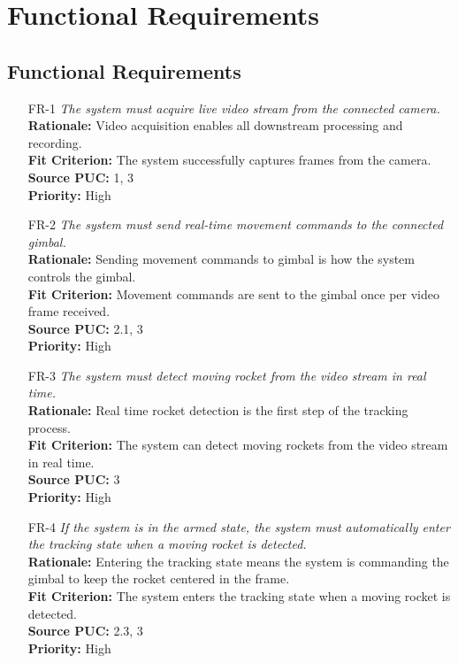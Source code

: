 \documentclass[12pt]{article}
\begin{document}
\section{Functional Requirements}
\subsection{Functional Requirements}

\begin{itemize}[leftmargin=*]

  \item[FR-1] \emph{The system must acquire live video stream from the connected
          camera.}\\[2mm]
        \textbf{Rationale:} Video acquisition enables all downstream processing and recording.\\
        \textbf{Fit Criterion:} The system successfully captures frames from the camera.\\
        \textbf{Source PUC:} 1, 3 \\
        \textbf{Priority:} High

  \item[FR-2] \emph{The system must send real-time movement commands to the connected
          gimbal.}\\[2mm]
        \textbf{Rationale:} Sending movement commands to gimbal is how the system controls the gimbal.\\
        \textbf{Fit Criterion:} Movement commands are sent to the gimbal once per video frame received.\\
        \textbf{Source PUC:} 2.1, 3 \\
        \textbf{Priority:} High

  \item[FR-3] \emph{The system must detect moving rocket from the video stream in real
          time.}\\[2mm]
        \textbf{Rationale:} Real time rocket detection is the first step of the tracking process.\\
        \textbf{Fit Criterion:} The system can detect moving rockets from the video stream in real time.\\
        \textbf{Source PUC:} 3 \\
        \textbf{Priority:} High

  \item[FR-4] \emph{If the system is in the armed state, the system must automatically
          enter the tracking state when a moving rocket is detected.}\\[2mm]
        \textbf{Rationale:} Entering the tracking state means the system is commanding the gimbal to keep the rocket centered in the frame.\\
        \textbf{Fit Criterion:} The system enters the tracking state when a moving rocket is detected.\\
        \textbf{Source PUC:} 2.3, 3 \\
        \textbf{Priority:} High


\end{itemize}
\end{document}
